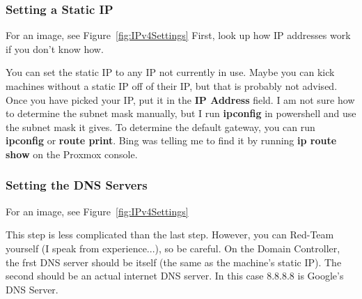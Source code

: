 \documentclass{article}
\begin{document}
\subsubsection{Setting a Static IP}
For an image, see Figure~\ref{fig:IPv4Settings}
First, look up how IP addresses work if you don't know how.

You can set the static IP to any IP not currently in use.
Maybe you can kick machines without a static IP off of their IP, but that is probably not advised.
Once you have picked your IP, put it in the \textbf{IP Address} field.
I am not sure how to determine the subnet mask manually, but I run \textbf{ipconfig} in powershell
and use the subnet mask it gives.
To determine the default gateway, you can run \textbf{ipconfig} or \textbf{route print}.
Bing was telling me to find it by running \textbf{ip route show} on the Proxmox console.


\subsubsection{Setting the DNS Servers}
For an image, see Figure~\ref{fig:IPv4Settings}

This step is less complicated than the last step. However, you can Red-Team yourself (I speak from experience...), so be careful.
On the Domain Controller, the frst DNS server should be itself (the same as the machine's static IP). The second should be an actual internet DNS server.
In this case 8.8.8.8 is Google's DNS Server.
\end{document}
